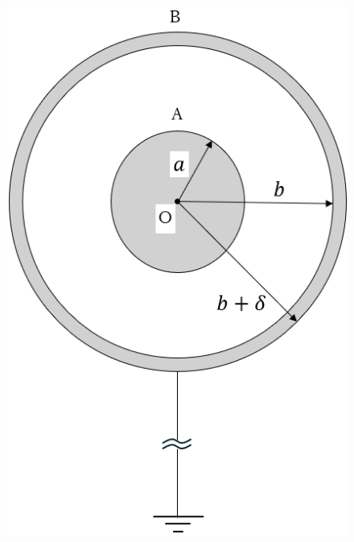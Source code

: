 \begin{figure}[H]
  \centering
  \begin{minipage}{.3\columnwidth}
    \includegraphics[width=\columnwidth]{../graphs/open_19_8_2-2.png}
    \caption{}
  \end{minipage}
  \hspace{.1\columnwidth}
  \begin{minipage}{.3\columnwidth}
    \centering

\end{minipage}
\end{figure}
